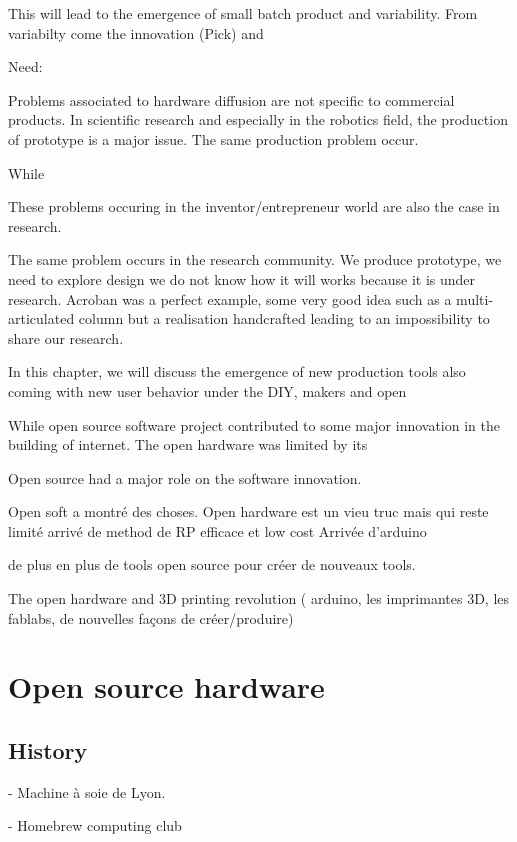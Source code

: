 This will lead to the emergence of small batch product and variability. From variabilty come the innovation (Pick) and


Need:

Problems associated to hardware diffusion are not specific to commercial products. In scientific research and especially in the robotics field, the production of prototype is a major issue. The same production problem occur.

While

These problems occuring in the inventor/entrepreneur world are also the case in research.

The same problem occurs in the research community. We produce prototype, we need to explore design we do not know how it will works because it is under research.
Acroban was a perfect example, some very good idea such as a multi-articulated column but a realisation handcrafted leading to an impossibility to share our research.

In this chapter, we will discuss the emergence of new production tools also coming with new user behavior under the DIY, makers and open

While open source software project contributed to some major innovation in the building of internet. The open hardware was limited by its

Open source had a major role on the software innovation.

Open soft a montré des choses.
Open hardware est un vieu truc mais qui reste limité
arrivé de method de RP efficace et low cost
Arrivée d'arduino

de plus en plus de tools open source pour créer de nouveaux tools.


The open hardware and 3D printing revolution ( arduino, les imprimantes 3D, les fablabs, de nouvelles façons de créer/produire)

\section{Open source hardware} %

\subsection{History} %
- Machine à soie de Lyon.

- Homebrew computing club


